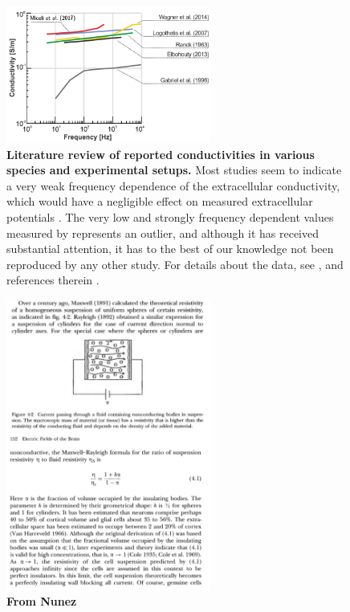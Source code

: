 \begin{figure}[!ht]
\begin{center}
\includegraphics[width=0.6\textwidth]{Figures/Sigma/frequency_dependence.png}
\end{center}
\caption{\textbf{Literature review of reported conductivities in various species and experimental setups.} 
Most studies seem to indicate a very weak frequency dependence of the extracellular conductivity, which would have a negligible effect on measured extracellular potentials \citep{Miceli2017}. The very low and strongly frequency dependent values measured by \cite{Gabriel1996} represents an outlier, and although it has received substantial attention, it has to the best of our knowledge not been reproduced by any other study. For details about the data, see \cite{Miceli2017}, and references therein \citep{Ranck1963, Gabriel1996, Logothetis2007, Elbohouty2013, Wagner2014}.
}
\label{Sigma:fig:freq_dep}
\end{figure}



\begin{figure}[!ht]
\begin{center}
\includegraphics[width=0.6\textwidth]{Figures/Sigma/resistivity_maxwell.png}
\end{center}
\caption{\textbf{From Nunez} }
\label{Sigma:fig:maxwell_resistivity}
\end{figure}


